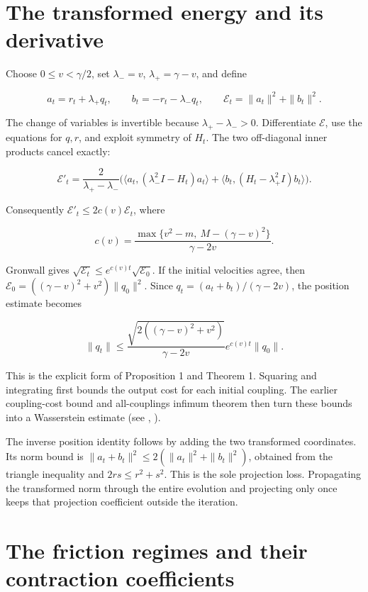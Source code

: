 \documentclass[11pt,a4paper]{report}
\begin{document}
\section{\texorpdfstring{The transformed energy and its derivative}{The transformed energy and its derivative}}


Choose \(0\le v<\gamma/2\), set \(\lambda_-=v\),
\(\lambda_+=\gamma-v\), and define


\[a_t=r_t+\lambda_+q_t,\qquad b_t=-r_t-\lambda_-q_t,
\qquad \mathcal E_t=\|a_t\|^2+\|b_t\|^2.\]


The change of variables is invertible because \(\lambda_+-\lambda_->0\).
Differentiate \(\mathcal E\), use the equations for \(q,r\), and exploit
symmetry of \(H_t\). The two off-diagonal inner products cancel exactly:


\[\mathcal E'_t=
\frac{2}{\lambda_+-\lambda_-}
\bigl(\langle a_t,(\lambda_-^2I-H_t)a_t\rangle
+\langle b_t,(H_t-\lambda_+^2I)b_t\rangle\bigr).\]


Consequently \(\mathcal E'_t\le2c(v)\mathcal E_t\), where


\[c(v)=\frac{\max\{v^2-m,\ M-(\gamma-v)^2\}}{\gamma-2v}.\]


Gronwall gives \(\sqrt{\mathcal E_t}\le e^{c(v)t}\sqrt{\mathcal E_0}\).
If the initial velocities agree, then
\(\mathcal E_0=((\gamma-v)^2+v^2)\|q_0\|^2\). Since
\(q_t=(a_t+b_t)/(\gamma-2v)\), the position estimate becomes


\[\|q_t\|\le
\frac{\sqrt{2((\gamma-v)^2+v^2)}}{\gamma-2v}
e^{c(v)t}\|q_0\|.\]


This is the explicit form of Proposition 1 and Theorem 1. Squaring and integrating first bounds the output cost for each initial coupling. The earlier coupling-cost bound and all-couplings infimum theorem then turn these bounds into a Wasserstein estimate (see \cite[Section~3.17.13]{LangevinLean2026ULASC}, \cite[Section~3.18.4]{LangevinLean2026ULASC}).



The inverse position identity follows by adding the two transformed coordinates. Its norm bound is \(\|a_t+b_t\|^2\le2(\|a_t\|^2+\|b_t\|^2)\), obtained from the triangle inequality and \(2rs\le r^2+s^2\). This is the sole projection loss. Propagating the transformed norm through the entire evolution and projecting only once keeps that projection coefficient outside the iteration.

\section{\texorpdfstring{The friction regimes and their contraction coefficients}{The friction regimes and their contraction coefficients}}
\end{document}
